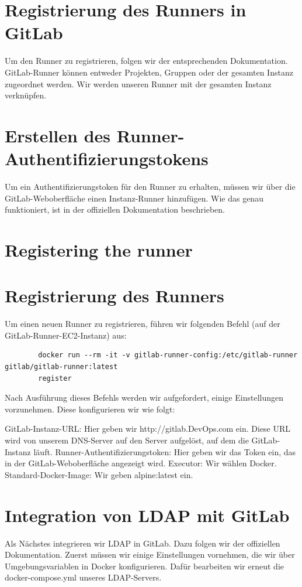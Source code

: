 \documentclass[a4paper,12pt]{article}
\begin{document}
\section{Registrierung des Runners in GitLab}
Um den Runner zu registrieren, folgen wir der entsprechenden Dokumentation.  
GitLab-Runner können entweder Projekten, Gruppen oder der gesamten Instanz zugeordnet werden.  
Wir werden unseren Runner mit der gesamten Instanz verknüpfen.

\section{Erstellen des Runner-Authentifizierungstokens}
Um ein Authentifizierungstoken für den Runner zu erhalten, müssen wir über die GitLab-Weboberfläche einen Instanz-Runner hinzufügen.  
Wie das genau funktioniert, ist in der offiziellen Dokumentation beschrieben.

\section{Registering the runner}

\section{Registrierung des Runners}
Um einen neuen Runner zu registrieren, führen wir folgenden Befehl (auf der GitLab-Runner-EC2-Instanz) aus:

\begin{verbatim}
		docker run --rm -it -v gitlab-runner-config:/etc/gitlab-runner gitlab/gitlab-runner:latest
		register
\end{verbatim}

Nach Ausführung dieses Befehls werden wir aufgefordert, einige Einstellungen vorzunehmen. Diese konfigurieren wir wie folgt:

GitLab-Instanz-URL: Hier geben wir http://gitlab.DevOps.com ein. Diese URL wird von unserem DNS-Server auf den Server aufgelöst, auf dem die GitLab-Instanz läuft.
Runner-Authentifizierungstoken: Hier geben wir das Token ein, das in der GitLab-Weboberfläche angezeigt wird.
Executor: Wir wählen Docker.
Standard-Docker-Image: Wir geben alpine:latest ein.

\section{Integration von LDAP mit GitLab} Als Nächstes integrieren wir LDAP in GitLab. Dazu folgen wir der offiziellen Dokumentation.
Zuerst müssen wir einige Einstellungen vornehmen, die wir über Umgebungsvariablen in Docker konfigurieren. Dafür bearbeiten wir erneut die docker-compose.yml unseres LDAP-Servers.
\end{document}
